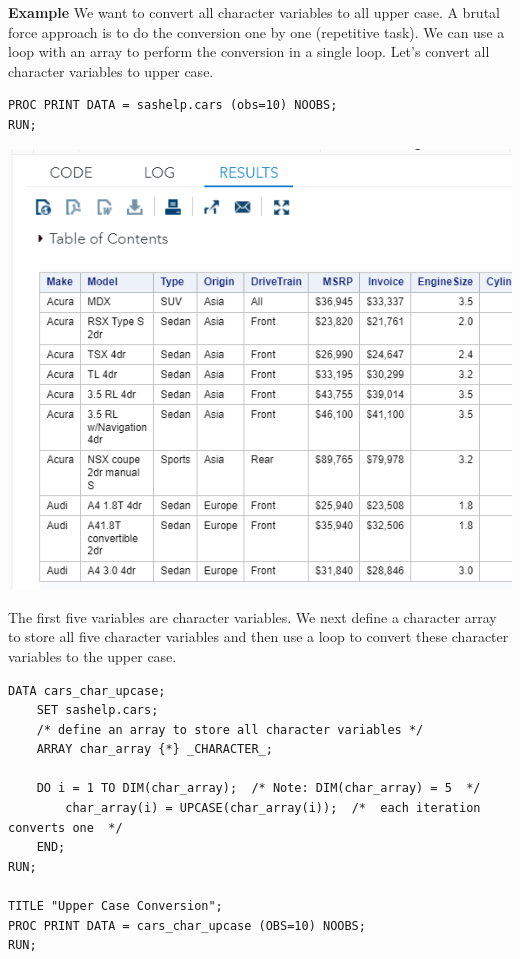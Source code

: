 \documentclass[
]{book}
\begin{document}
\textbf{Example} We want to convert all character variables to all upper case. A brutal force approach is to do the conversion one by one (repetitive task). We can use a loop with an array to perform the conversion in a single loop. Let's convert all character variables to upper case.

\begin{verbatim}
PROC PRINT DATA = sashelp.cars (obs=10) NOOBS;
RUN;
\end{verbatim}

\begin{center}\includegraphics[width=1\linewidth]{img11/w11-CarsPreview} \end{center}

The first five variables are character variables. We next define a character array to store all five character variables and then use a loop to convert these character variables to the upper case.

\begin{verbatim}
DATA cars_char_upcase;
    SET sashelp.cars;
    /* define an array to store all character variables */
    ARRAY char_array {*} _CHARACTER_;
 
    DO i = 1 TO DIM(char_array);  /* Note: DIM(char_array) = 5  */
        char_array(i) = UPCASE(char_array(i));  /*  each iteration converts one  */
    END;
RUN;

TITLE "Upper Case Conversion";
PROC PRINT DATA = cars_char_upcase (OBS=10) NOOBS;
RUN;
\end{verbatim}
\end{document}
